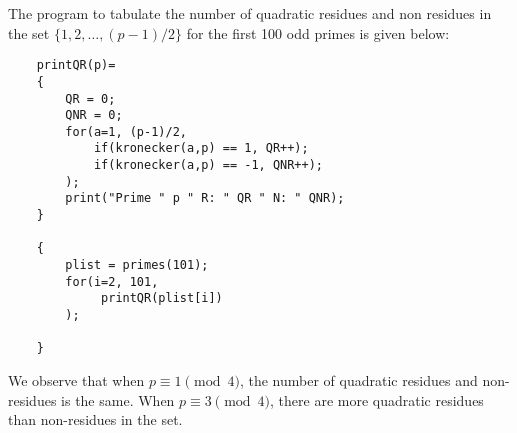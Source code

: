 \documentclass[psamsfonts]{amsart}
\newenvironment{sol}{{\bfseries Solution}}{\qedsymbol}
\theoremstyle{definition}
\theoremstyle{remark}
\numberwithin{equation}{section}
\begin{document}
\begin{sol}
The program to tabulate the number of quadratic residues and non residues in the set $\{1, 2, \ldots, (p-1)/2 \}$ for the first 100 odd primes is given below:
\begin{verbatim}
    printQR(p)=
    {
        QR = 0;
        QNR = 0;
        for(a=1, (p-1)/2,
            if(kronecker(a,p) == 1, QR++);
            if(kronecker(a,p) == -1, QNR++);
        );
        print("Prime " p " R: " QR " N: " QNR);
    }

    {
        plist = primes(101);
        for(i=2, 101,
             printQR(plist[i])
        );

    }
\end{verbatim}

We observe that when $p \equiv 1 \pmod{4}$, the number of quadratic residues and non-residues is the same. When $p \equiv 3 \pmod{4}$, there are more quadratic residues than non-residues in the set.
\end{sol}
\end{document}
